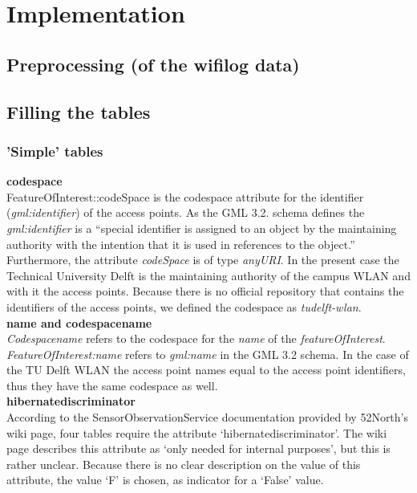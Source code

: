 \chapter{Implementation}

\section{Preprocessing (of the wifilog data)}

\section{Filling the tables}

\subsection{'Simple' tables}
\textbf{codespace}\\
FeatureOfInterest::codeSpace is the codespace attribute for the identifier (\textit{gml:identifier}) of the access points. As the GML 3.2. schema defines the \textit{gml:identifier} is a “special identifier is assigned to an object by the maintaining authority with the intention that it is used in references to the object.” Furthermore, the attribute \textit{codeSpace} is of type \textit{anyURI}. In the present case the Technical University Delft is the maintaining authority of the campus WLAN and with it the access points. Because there is no official repository that contains the identifiers of the access points, we defined the codespace as \textit{tudelft-wlan}.\\

\textbf{name and codespacename}\\
\textit{Codespacename} refers to the codespace for the \textit{name} of the \textit{featureOfInterest}. \textit{FeatureOfInterest:name} refers to \textit{gml:name} in the GML 3.2 schema. In the case of the TU Delft WLAN the access point names equal to the access point identifiers, thus they have the same codespace as well.\\

\textbf{hibernatediscriminator}\\
According to the SensorObservationService documentation provided by 52North’s wiki page, four tables require the attribute ‘hibernatediscriminator’. The wiki page describes this attribute as ‘only needed for internal purposes’, but this is rather unclear. Because there is no clear description on the value of this attribute, the value ‘F’ is chosen, as indicator for a ‘False’ value.

